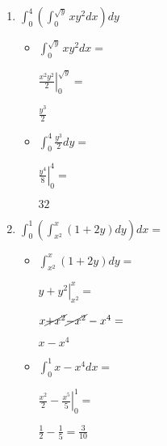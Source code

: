 \documentclass[../practica_08.tex]{subfiles}
\begin{document}
    \begin{enumerate}
        \item $\int_0^4 (\int_0^{\sqrt{y}} xy^2 dx) dy$
        
            \begin{itemize}
                \item $\int_0^{\sqrt{y}} xy^2 dx = $
                
                    $ \left. \frac{x^2y^2}{2}  \right |_0^{\sqrt{y}} = $

                    $ \frac{y^3}{2} $

                \item $ \int_0^4 \frac{y^3}{2} dy = $

                    $ \left. \frac{y^4}{8} \right |_0^4 = $

                    $ 32 $

            \end{itemize}

        \item $\int_0^1 ( \int_{x^2}^{x} (1+2y)dy ) dx = $
        
            \begin{itemize}
                \item $ \int_{x^2}^{x} (1+2y)dy =  $
                
                    $ \left. y + y^2 \right |_{x^2}^{x} =$

                    $ x \cancel{+ x^2} \cancel{- x^2} - x^4 = $

                    $ x - x^4$

                \item $\int_0^1 x - x^4 dx = $
                
                    $\left. \frac{x^2}{2} - \frac{x^5}{5} \right |_0^1 = $

                    $ \frac{1}{2} - \frac{1}{5} = \frac{3}{10}$

            \end{itemize}

    \end{enumerate}
\end{document}
